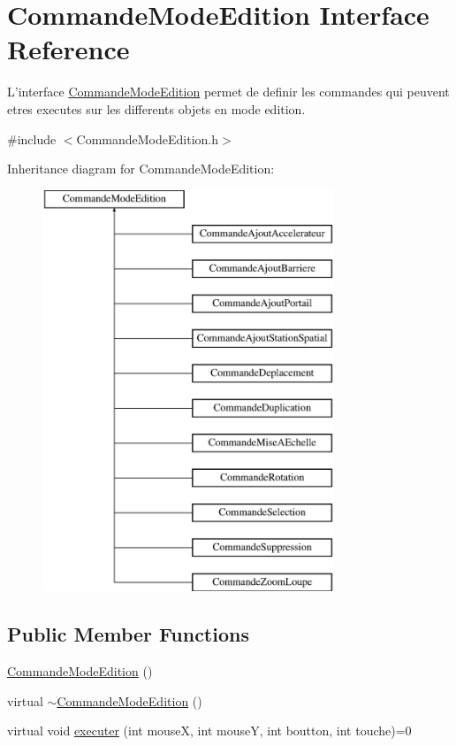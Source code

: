 \hypertarget{class_commande_mode_edition}{\section{Commande\-Mode\-Edition Interface Reference}
\label{class_commande_mode_edition}
}


L'interface \hyperlink{class_commande_mode_edition}{Commande\-Mode\-Edition} permet de definir les commandes qui peuvent etres executes sur les differents objets en mode edition.  




{\ttfamily \#include $<$Commande\-Mode\-Edition.\-h$>$}

Inheritance diagram for Commande\-Mode\-Edition\-:\begin{figure}[H]
\begin{center}
\leavevmode
\includegraphics[height=12.000000cm]{class_commande_mode_edition}
\end{center}
\end{figure}
\subsection*{Public Member Functions}
\begin{DoxyCompactItemize}
\item 
\hyperlink{class_commande_mode_edition_ae6d4fef67683ce568a8c34b7329fd759}{Commande\-Mode\-Edition} ()
\item 
virtual \hyperlink{class_commande_mode_edition_af499078eaf3c840c1abb885c18581221}{$\sim$\-Commande\-Mode\-Edition} ()
\item 
virtual void \hyperlink{class_commande_mode_edition_aca77e9bb8557971af33748041975eecb}{executer} (int mouse\-X, int mouse\-Y, int boutton, int touche)=0
\end{DoxyCompactItemize}
